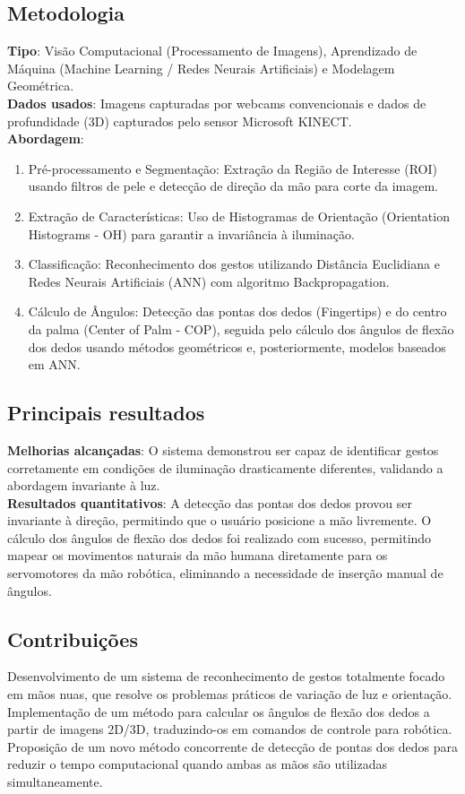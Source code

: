 \documentclass[12pt, a4paper]{article}
\begin{document}
\subsection{Metodologia}
\textbf{Tipo}: Visão Computacional (Processamento de Imagens), Aprendizado de Máquina (Machine Learning / Redes Neurais Artificiais) e Modelagem Geométrica.\\
\textbf{Dados usados}: Imagens capturadas por webcams convencionais e dados de profundidade (3D) capturados pelo sensor Microsoft KINECT.\\
\textbf{Abordagem}:\\
\begin{enumerate}
\item Pré-processamento e Segmentação: Extração da Região de Interesse (ROI) usando filtros de pele e detecção de direção da mão para corte da imagem.\\
\item Extração de Características: Uso de Histogramas de Orientação (Orientation Histograms - OH) para garantir a invariância à iluminação.\\
\item Classificação: Reconhecimento dos gestos utilizando Distância Euclidiana e Redes Neurais Artificiais (ANN) com algoritmo Backpropagation.\\
\item Cálculo de Ângulos: Detecção das pontas dos dedos (Fingertips) e do centro da palma (Center of Palm - COP), seguida pelo cálculo dos ângulos de flexão dos dedos usando métodos geométricos e, posteriormente, modelos baseados em ANN.\\
\end{enumerate}
\subsection{Principais resultados}
\textbf{Melhorias alcançadas}: O sistema demonstrou ser capaz de identificar gestos corretamente em condições de iluminação drasticamente diferentes, validando a abordagem invariante à luz.\\
\textbf{Resultados quantitativos}: A detecção das pontas dos dedos provou ser invariante à direção, permitindo que o usuário posicione a mão livremente. O cálculo dos ângulos de flexão dos dedos foi realizado com sucesso, permitindo mapear os movimentos naturais da mão humana diretamente para os servomotores da mão robótica, eliminando a necessidade de inserção manual de ângulos.\\
\subsection{Contribuições}
Desenvolvimento de um sistema de reconhecimento de gestos totalmente focado em mãos nuas, que resolve os problemas práticos de variação de luz e orientação.\\
Implementação de um método para calcular os ângulos de flexão dos dedos a partir de imagens 2D/3D, traduzindo-os em comandos de controle para robótica.\\
Proposição de um novo método concorrente de detecção de pontas dos dedos para reduzir o tempo computacional quando ambas as mãos são utilizadas simultaneamente.\\
\end{document}
